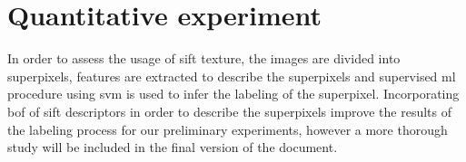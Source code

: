 \documentclass[a4paper, 10pt, conference]{llncs}      %
\begin{document}
\section{Quantitative experiment}
In order to assess the usage of \ac{sift} texture, the images are divided into superpixels, features are extracted to describe the superpixels and supervised \ac{ml} procedure using \ac{svm} is used to infer the labeling of the superpixel. Incorporating \ac{bof} of \ac{sift} descriptors in order to describe the superpixels improve the results of the labeling process for our preliminary experiments, however a more thorough study will be included in the final version of the document.


\newpage
%


\end{document}
